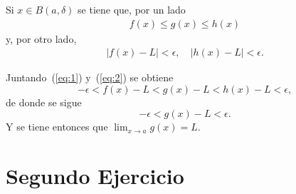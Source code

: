 \documentclass[fleqn,leqno,10pt,letterpaper,final]{article}
\begin{document}
Si $x\in B(a,\delta)$ se tiene que, por un lado
\begin{align}\label{eq:1}
	f(x)\leq g(x)\leq h(x)
\end{align}
y, por otro lado,
\begin{align}\label{eq:2}
	\left\lvert f(x)-L \right\rvert <\epsilon,\quad \left\lvert h(x)-L \right\rvert<\epsilon.
\end{align}

Juntando~(\ref{eq:1}) y~(\ref{eq:2}) se obtiene
\[
	-\epsilon<f(x)-L<g(x)-L<h(x)-L<\epsilon,
\]
de donde se sigue
\[
	-\epsilon<g(x)-L<\epsilon.
\]
Y se tiene entonces que $ \lim_{x\to a}g(x)=L $.

\section{Segundo Ejercicio}%
\end{document}
